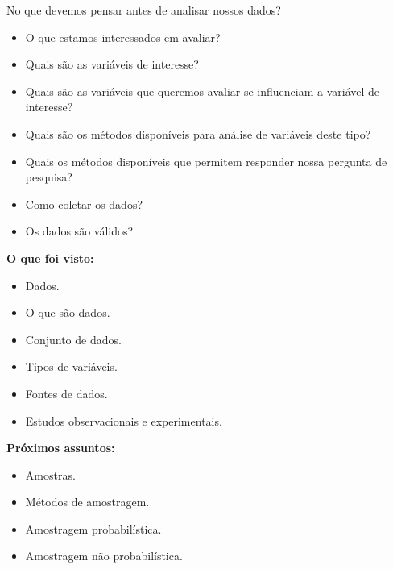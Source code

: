\documentclass[
  ignorenonframetext,
  serif,
  professionalfont,
  usenames,
  dvipsnames,
  aspectratio = 169]{beamer}
\providecommand{\tightlist}{%
  \setlength{\itemsep}{0pt}\setlength{\parskip}{0pt}}
\renewcommand{\tightlist}{%
  \setlength{\itemsep}{0\baselineskip}
  \setlength{\parskip}{0.25\baselineskip}
}
\def\beginAHalfColumn{\begin{minipage}{0.49\textwidth}}%
\def\endColumns{\end{minipage}}%
\begin{document}
\begin{frame}{No que devemos pensar antes de analisar nossos dados?}
\protect\hypertarget{no-que-devemos-pensar-antes-de-analisar-nossos-dados}{}
\begin{itemize}
\tightlist
\item
  O que estamos interessados em avaliar?
\item
  Quais são as variáveis de interesse?
\item
  Quais são as variáveis que queremos avaliar se influenciam a variável
  de interesse?
\item
  Quais são os métodos disponíveis para análise de variáveis deste tipo?
\item
  Quais os métodos disponíveis que permitem responder nossa pergunta de
  pesquisa?
\item
  Como coletar os dados?
\item
  Os dados são válidos?
\end{itemize}
\end{frame}

\begin{frame}{}
\protect\hypertarget{section}{}
\beginAHalfColumn

\textbf{O que foi visto:}

\begin{itemize}
\tightlist
\item
  Dados.
\item
  O que são dados.
\item
  Conjunto de dados.
\item
  Tipos de variáveis.
\item
  Fontes de dados.
\item
  Estudos observacionais e experimentais.
\end{itemize}

\endColumns
\beginAHalfColumn

\textbf{Próximos assuntos:}

\begin{itemize}
\tightlist
\item
  Amostras.
\item
  Métodos de amostragem.
\item
  Amostragem probabilística.
\item
  Amostragem não probabilística.
\end{itemize}

\endColumns
\end{frame}
\end{document}

